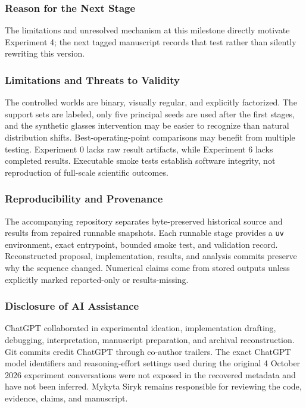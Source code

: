 \documentclass[
  10pt,
]{article}
\begin{document}
\hypertarget{reason-for-the-next-stage}{%
\subsubsection{Reason for the Next
Stage}\label{reason-for-the-next-stage}}

The limitations and unresolved mechanism at this milestone directly
motivate Experiment 4; the next tagged manuscript records that test
rather than silently rewriting this version.

\hypertarget{limitations-and-threats-to-validity}{%
\subsubsection{Limitations and Threats to
Validity}\label{limitations-and-threats-to-validity}}

The controlled worlds are binary, visually regular, and explicitly
factorized. The support sets are labeled, only five principal seeds are
used after the first stages, and the synthetic glasses intervention may
be easier to recognize than natural distribution shifts.
Best-operating-point comparisons may benefit from multiple testing.
Experiment 0 lacks raw result artifacts, while Experiment 6 lacks
completed results. Executable smoke tests establish software integrity,
not reproduction of full-scale scientific outcomes.

\hypertarget{reproducibility-and-provenance}{%
\subsubsection{Reproducibility and
Provenance}\label{reproducibility-and-provenance}}

The accompanying repository separates byte-preserved historical source
and results from repaired runnable snapshots. Each runnable stage
provides a \texttt{uv} environment, exact entrypoint, bounded smoke
test, and validation record. Reconstructed proposal, implementation,
results, and analysis commits preserve why the sequence changed.
Numerical claims come from stored outputs unless explicitly marked
reported-only or results-missing.

\hypertarget{disclosure-of-ai-assistance}{%
\subsubsection{Disclosure of AI
Assistance}\label{disclosure-of-ai-assistance}}

ChatGPT collaborated in experimental ideation, implementation drafting,
debugging, interpretation, manuscript preparation, and archival
reconstruction. Git commits credit ChatGPT through co-author trailers.
The exact ChatGPT model identifiers and reasoning-effort settings used
during the original 4 October 2026 experiment conversations were not
exposed in the recovered metadata and have not been inferred. Mykyta
Siryk remains responsible for reviewing the code, evidence, claims, and
manuscript.
\end{document}
